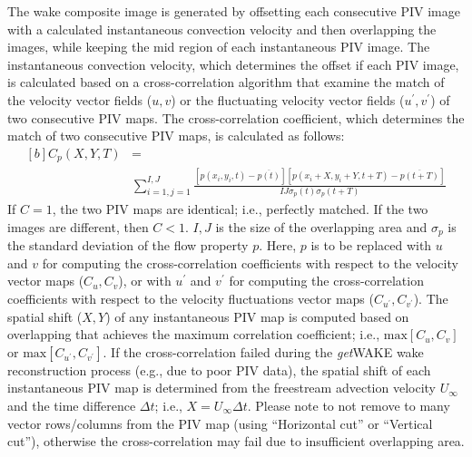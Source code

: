 \documentclass[12pt,a4paper]{article}
\begin{document}
The wake composite image is generated by offsetting each consecutive PIV image with a calculated instantaneous convection velocity and then overlapping the images, while keeping the mid region of each instantaneous PIV image. 
The instantaneous convection velocity, which determines the offset if each PIV image, is calculated based on a cross-correlation algorithm that examine the match of the velocity vector fields ($u,v$) or the fluctuating velocity vector fields ($u^{\prime},v^{\prime}$) of two consecutive PIV maps.
The cross-correlation coefficient, which determines the match of two consecutive PIV maps, is calculated as follows:
\begin{equation}
\begin{aligned}[b]
C_p(X,Y,T)&=    \\
&\sum_{i=1,j=1}^{I,J} \frac{\left[ p(x_i,y_i,t) - \overline{p(t)} \right] \left[ p(x_i+X,y_i+Y,t+T) - \overline{p(t+T)} \right]}{IJ\sigma_p(t)\sigma_p(t+T)}
\label{eq:Cp}
\end{aligned}
\end{equation}
If $C=1$, the two PIV maps are identical; i.e., perfectly matched. If the two images are different, then $C<1$.
$I,J$ is the size of the overlapping area and $\sigma_p$ is the standard deviation of the flow property $p$. Here, $p$ is to be replaced with $u$ and $v$ for computing the cross-correlation coefficients with respect to the velocity vector maps ($C_u,C_v$), or with $u^{\prime}$ and $v^{\prime}$ for computing the cross-correlation coefficients with respect to the velocity fluctuations vector maps ($C_{u^{\prime}},C_{v^{\prime}}$).
The spatial shift ($X,Y$) of any instantaneous PIV map is computed based on overlapping that achieves the maximum correlation coefficient; i.e., $\mathrm{max}\left[C_u,C_v\right]$ or $\mathrm{max}\left[C_{u^\prime},C_{v^\prime}\right]$.
If the cross-correlation failed during the \textit{get}WAKE wake reconstruction process (e.g., due to poor PIV data), the spatial shift of each instantaneous PIV map is determined from the freestream advection velocity $U_\infty$ and the time difference $\Delta t$; i.e., $X=U_\infty\Delta t$.
Please note to not remove to many vector rows/columns from the PIV map (using ``Horizontal cut'' or ``Vertical cut''), otherwise the cross-correlation may fail due to insufficient overlapping area.
\end{document}
